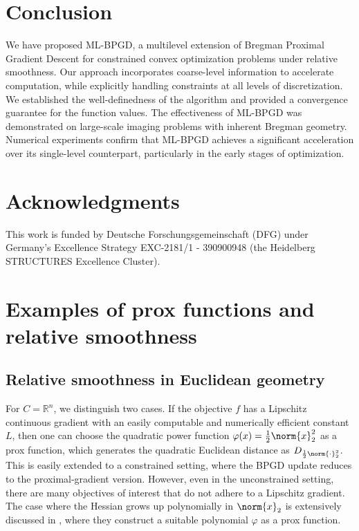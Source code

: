 \documentclass[11pt,reqno]{amsart}
\numberwithin{equation}{section}
\numberwithin{figure}{section}
\theoremstyle{plain}
\theoremstyle{definition}
\newcommand{\R}{\mathbb{R}}
\newcommand{\vphi}{\varphi}
\begin{document}
\section{Conclusion} \label{sec:conclusions}
We have proposed ML-BPGD, a multilevel extension of Bregman Proximal Gradient Descent for constrained convex optimization problems under relative smoothness. Our approach incorporates coarse-level information to accelerate computation, while explicitly handling constraints at all levels of discretization. We established the well-definedness of the algorithm and provided a convergence guarantee for the function values. The effectiveness of ML-BPGD was demonstrated on large-scale imaging problems with inherent Bregman geometry. Numerical experiments confirm that ML-BPGD achieves a significant acceleration over its single-level counterpart, particularly in the early stages of optimization.


\section*{Acknowledgments}This work is funded by Deutsche Forschungsgemeinschaft (DFG) under Germany’s Excellence Strategy EXC-2181/1 - 390900948 (the Heidelberg STRUCTURES Excellence Cluster).

\appendix
{}
\section{Examples of prox functions and relative smoothness} \label{apdx:A}
\subsection{Relative smoothness in Euclidean geometry} For $C = \R^n$, we distinguish two cases. If the objective $f$ has a Lipschitz continuous gradient with an easily computable and numerically efficient constant $L$, then one can choose the quadratic power function $\vphi(x) = \frac{1}{2} \norm{x}_2^2$ as a prox function, which generates the quadratic Euclidean distance as $D_{\frac{1}{2} \norm{\cdot}_2^2}$. This is easily extended to a constrained setting, where the BPGD update reduces to the proximal-gradient version.
However, even in the unconstrained setting, there are many objectives of interest that do not adhere to a Lipschitz gradient. The case where the Hessian grows up 
polynomially in $\norm{x}_2$ is extensively discussed in \cite{Lu2018}, where they construct a suitable polynomial $\vphi$ as a prox function.
\end{document}
